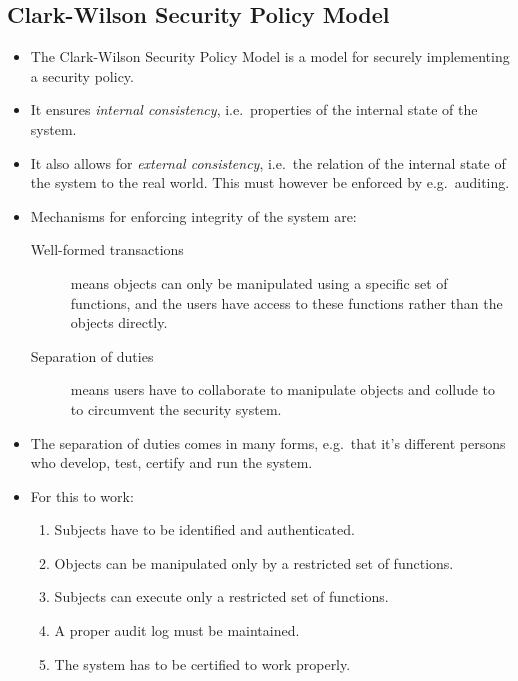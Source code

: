 \subsection{Clark-Wilson Security Policy Model}

\begin{frame}
  \begin{itemize}
    \item The Clark-Wilson Security Policy Model is a model for securely 
      implementing a security policy.

    \item It ensures \emph{internal consistency}, i.e.\ properties of the 
      internal state of the system.

    \item It also allows for \emph{external consistency}, i.e.\ the relation of 
      the internal state of the system to the real world.
      This must however be enforced by e.g.\ auditing.
  \end{itemize}
\end{frame}

\begin{frame}
  \begin{itemize}
    \item Mechanisms for enforcing integrity of the system are:
      \begin{description}
        \item[Well-formed transactions] means objects can only be manipulated 
          using a specific set of functions, and the users have access to these 
          functions rather than the objects directly.

        \item[Separation of duties] means users have to collaborate to 
          manipulate objects and collude to to circumvent the security system.
      \end{description}

    \item The separation of duties comes in many forms, e.g.\ that it's 
      different persons who develop, test, certify and run the system.

  \end{itemize}
\end{frame}

\begin{frame}
  \begin{itemize}
    \item For this to work:
      \begin{enumerate}
        \item Subjects have to be identified and authenticated.
        \item Objects can be manipulated only by a restricted set of functions.
        \item Subjects can execute only a restricted set of functions.
        \item A proper audit log must be maintained.
        \item The system has to be certified to work properly.
      \end{enumerate}
  \end{itemize}
\end{frame}

